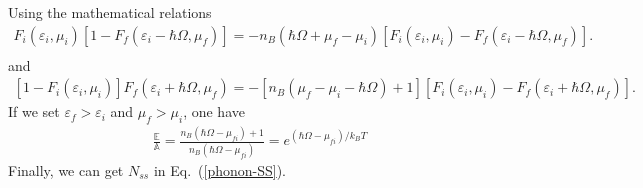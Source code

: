 \documentclass[aps
,floatfix,footinbib,
preprint
]{revtex4-1}
\begin{document}
Using the mathematical relations
\begin{equation}
\begin{split}
F_{i}(\varepsilon_{i},\mu_{i})[1-F_{f}(\varepsilon_{i}-\hbar\Omega,\mu_{f})]=-n_{B}(\hbar\Omega+\mu_{f}-\mu_{i})[F_{i}(\varepsilon_{i},\mu_{i})-F_{f}(\varepsilon_{i}-\hbar\Omega,\mu_{f})].\\
\end{split}
\end{equation}
and
\begin{equation}
\begin{split}
[1-F_{i}(\varepsilon_{i},\mu_{i})]F_{f}(\varepsilon_{i}+\hbar\Omega,\mu_{f})=-[n_{B}(\mu_{f}-\mu_{i}-\hbar\Omega)+1][F_{i}(\varepsilon_{i},\mu_{i})-F_{f}(\varepsilon_{i}+\hbar\Omega,\mu_{f})].
\end{split}
\end{equation}
If we set $\varepsilon_{f}>\varepsilon_{i}$ and $\mu_{f}>\mu_{i}$, one have
\begin{equation}
\begin{split}
\frac{\mathbb{E}}{\mathbb{A}}=\frac{n_{B}(\hbar\Omega-\mu_{fi})+1}{n_{B}(\hbar\Omega-\mu_{fi})}=e^{(\hbar\Omega-\mu_{fi})/k_{B}T}
\end{split}
\end{equation}
Finally, we can get $N_{ss}$ in Eq.~(\ref{phonon-SS}).
\fi






\end{document}
